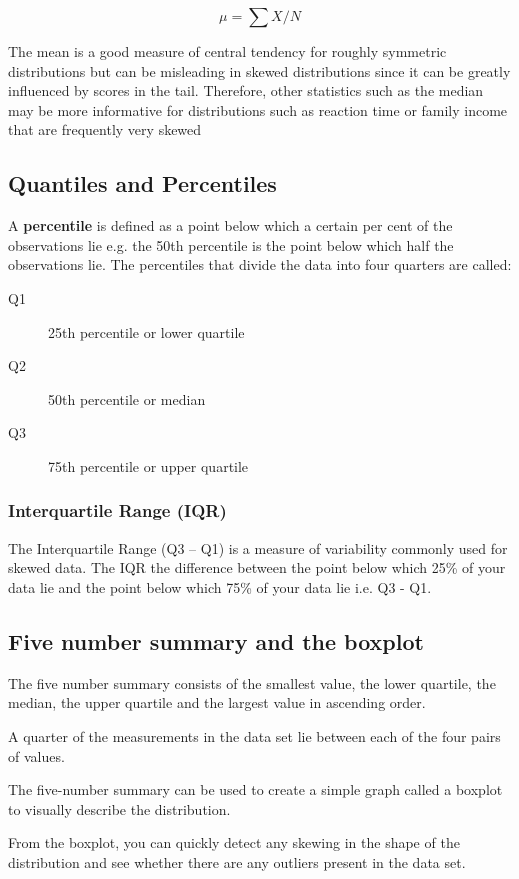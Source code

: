 \documentclass[12pt]{article}
\begin{document}
\[\mu = \sum X/N\]

The mean is a good measure of central tendency for roughly symmetric distributions but can be misleading in skewed distributions since it can be greatly influenced by scores in the tail. Therefore, other statistics such as the median may be more informative for distributions such as reaction time or family income that are frequently very skewed

\subsection{Quantiles and Percentiles}

A \textbf{percentile} is defined as a point below which a certain per cent of the observations lie e.g. the 50th percentile is the point below which half the observations lie. The percentiles that divide the data into four quarters are called: 
\begin{description}
\item[Q1] 25th percentile or lower quartile
\item[Q2] 50th percentile or median
\item[Q3] 75th percentile or upper quartile
\end{description}

\subsubsection{Interquartile Range (IQR)}
The Interquartile Range (Q3 – Q1) is a  measure of variability commonly used for skewed data.
The IQR  the difference between the point below which 25\% of your data lie and the point below which 75\% of your data lie i.e. Q3  - Q1. 

\subsection{Five number summary and the boxplot}

The five number summary consists of the smallest value, the lower quartile, the median, the upper quartile and the largest value in ascending order.

A quarter of the measurements in the data set lie between each of the four pairs of values. 

The five-number summary can be used to create a simple graph called a boxplot to visually describe the distribution.

From the boxplot, you can quickly detect any skewing in the shape of the distribution and see whether there are any outliers present in the data set.
\end{document}

